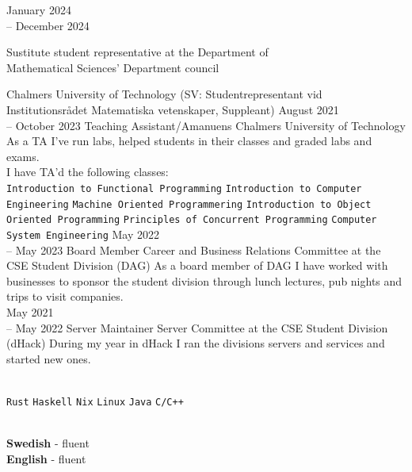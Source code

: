 \documentclass[9pt]{developercv}
\begin{document}
\begin{entrylist}
	\entry
		{January 2024 \\-- December 2024}
		{
			\begin{minipage}[t]{0.5\textwidth}
				Sustitute student representative at the Department of \\
				Mathematical Sciences' Department council
			\end{minipage}
		}
		{Chalmers University of Technology}
		{(SV: Studentrepresentant vid Institutionsrådet Matematiska vetenskaper, Suppleant)}
	\entry
		{August 2021 \\-- October 2023}
		{Teaching Assistant/Amanuens}
		{Chalmers University of Technology}
		{
			As a TA I've run labs, helped students in their classes and
			graded labs and exams.\\ I have TA'd the following classes:\\
			\texttt{Introduction to Functional Programming}\slashsep
			\texttt{Introduction to Computer Engineering}\slashsep
			\texttt{Machine Oriented Programmering}\slashsep
			\texttt{Introduction to Object Oriented Programming}\slashsep
			\texttt{Principles of Concurrent Programming}\slashsep
			\texttt{Computer System Engineering}
		}
	\entry
		{May 2022 \\-- May 2023}
		{Board Member}
		{Career and Business Relations Committee at the CSE Student Division (DAG)}
		{
			As a board member of DAG I have worked with
			businesses to sponsor the student division through
			lunch lectures, pub nights and trips to visit
			companies.\\
		}
	\entry
		{May 2021 \\-- May 2022}
		{Server Maintainer}
		{Server Committee at the CSE Student Division (dHack)}
		{
			During my year in dHack I ran the divisions servers and services and started new ones.\\
		}
\end{entrylist}
\hfill\\
	{
		\texttt{Rust}\slashsep
		\texttt{Haskell}\slashsep
		\texttt{Nix}\slashsep
		\texttt{Linux}\slashsep
		\texttt{Java}\slashsep
		\texttt{C/C++}
	}\\
\begin{minipage}[t]{0.2\textwidth}
	\vspace{-\baselineskip}
	\\
	\textbf{Swedish} - fluent\\
	\textbf{English} - fluent
\end{minipage}
\end{document}
